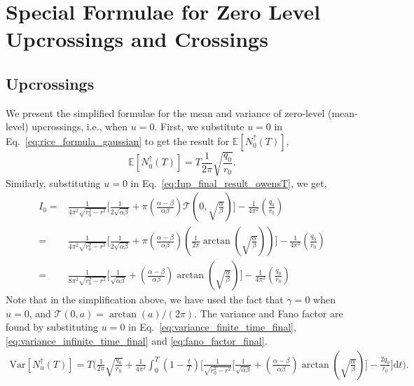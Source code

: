 \documentclass[journal]{IEEEtran}
\theoremstyle{plain}
\theoremstyle{definition}
\theoremstyle{remark}
\newcommand{\E}{\mathbb{E}}
\newcommand{\Ot}{\mathcal{T}}
\newcommand{\Nup}{N_u^{\uparrow}(T)}
\newcommand{\dd}{\mathrm{d}}
\newcommand{\Var}{\text{Var}}
\begin{document}
\section{Special Formulae for Zero Level Upcrossings and Crossings}
\label{section:special_formulae_mean}


\subsection{Upcrossings}
\label{section:mean_crossings}
We present the simplified formulae for the mean and variance of zero-level (mean-level) upcrossings, i.e., when $u=0$. First, we substitute $u=0$ in Eq.~\eqref{eq:rice_formula_gaussian} to get the result for $\E\left[N_0^\uparrow(T)\right]$,
\begin{equation}
    \E\left[N_0^\uparrow(T)\right] = T \frac{1}{2\pi}\sqrt{\frac{q_0}{r_0}}.
\end{equation}
Similarly, substituting $u=0$ in Eq.~\eqref{eq:Iup_final_result_owensT}, we get,
\begin{equation}
\begin{split}
    I_0 =& \frac{1}{4\pi^2\sqrt{r_0^2-r^2}} \Biggl[\frac{1}{2\sqrt{\alpha\beta}} + \pi \left(\frac{\alpha - \beta}{\alpha\beta}\right) \Ot\left(0, \sqrt{\frac{\alpha}{\beta}}\right)\Biggr] - \frac{1}{4\pi^2 }\left(\frac{q_0}{r_0}\right) \\
    =& \frac{1}{4\pi^2\sqrt{{r_0^2-r^2}}} \Biggl[\frac{1}{2\sqrt{\alpha\beta}} + \pi \left(\frac{\alpha - \beta}{\alpha\beta}\right) \left(\frac{1}{2\pi}\arctan\left(\sqrt{\frac{\alpha}{\beta}}\right)\right)\Biggr] - \frac{1}{4\pi^2 }\left(\frac{q_0}{r_0}\right) \\
    =& \frac{1}{8\pi^2\sqrt{r_0^2-r^2}}\Biggl[\frac{1}{\sqrt{\alpha\beta}} + \left(\frac{\alpha - \beta}{\alpha\beta}\right) \arctan\left(\sqrt{\frac{\alpha}{\beta}}\right)\Biggr] - \frac{1}{4\pi^2 }\left(\frac{q_0}{r_0}\right)
\end{split}
\end{equation}
Note that in the simplification above, we have used the fact that $\gamma=0$ when $u=0$, and $\Ot(0,a)=\arctan(a)/(2\pi)$. The variance and Fano factor are found by substituting $u=0$ in Eq.~\eqref{eq:variance_finite_time_final}, \eqref{eq:variance_infinite_time_final} and \eqref{eq:fano_factor_final}. 
\begin{equation}
\begin{aligned}
    \Var\left[\Nup\right] = T \Biggl(\frac{1}{2\pi}\sqrt{\frac{q_0}{r_0}}+ \frac{1}{4\pi^2}\int_{0}^T \left(1-\frac{t}{T}\right)  \Biggl[ \frac{1}{\sqrt{r_0^2-r^2}}\Biggl[\frac{1}{\sqrt{\alpha\beta}} + \left(\frac{\alpha - \beta}{\alpha\beta}\right) \arctan\left(\sqrt{\frac{\alpha}{\beta}}\right)\Biggr] - \frac{2q_0}{r_0}\Biggr]  \dd t\Biggr).
\end{aligned}
\end{equation}
\end{document}
